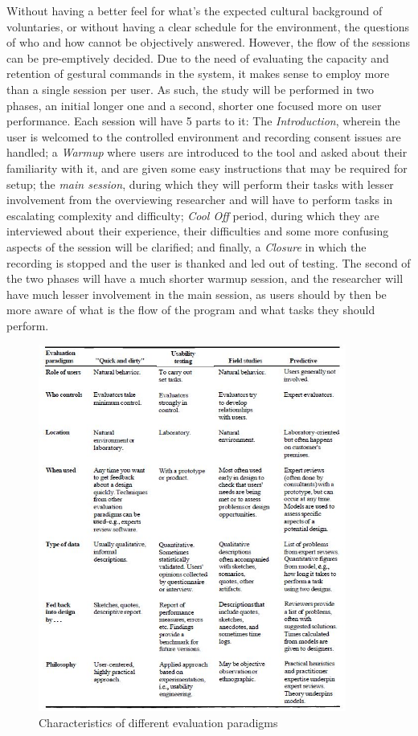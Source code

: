     Without having a better feel for what's the expected cultural background of voluntaries, or without having a clear schedule for the environment, the questions of who and how cannot be objectively answered. However, the flow of the sessions can be pre-emptively decided. Due to the need of evaluating the capacity and retention of gestural commands in the system, it makes sense to employ more than a single session per user. As such, the study will be performed in two phases, an initial longer one and a second, shorter one focused more on user performance. Each session will have 5 parts to it: The \emph{Introduction}, wherein the user is welcomed to the controlled environment and recording consent issues are handled; a \emph{Warmup} where users are introduced to the tool and asked about their familiarity with it, and are given some easy instructions that may be required for setup; the \emph{main session}, during which they will perform their tasks with lesser involvement from the overviewing researcher and will have to perform tasks in escalating complexity and difficulty; \emph{Cool Off} period, during which they are interviewed about their experience, their difficulties and some more confusing aspects of the session will be clarified; and finally, a \emph{Closure} in which the recording is stopped and the user is thanked and led out of testing. The second of the two phases will have a much shorter warmup session, and the researcher will have much lesser involvement in the main session, as users should by then be more aware of what is the flow of the program and what tasks they should perform.

    
\begin{figure}[ht]
    \centering
    \includegraphics[width=0.90\textwidth]{figures/EvaluationParadigms.JPG}
    \caption{\label{fig:Figure_Evaluation_Paradigms}Characteristics of different evaluation paradigms}
\end{figure}
